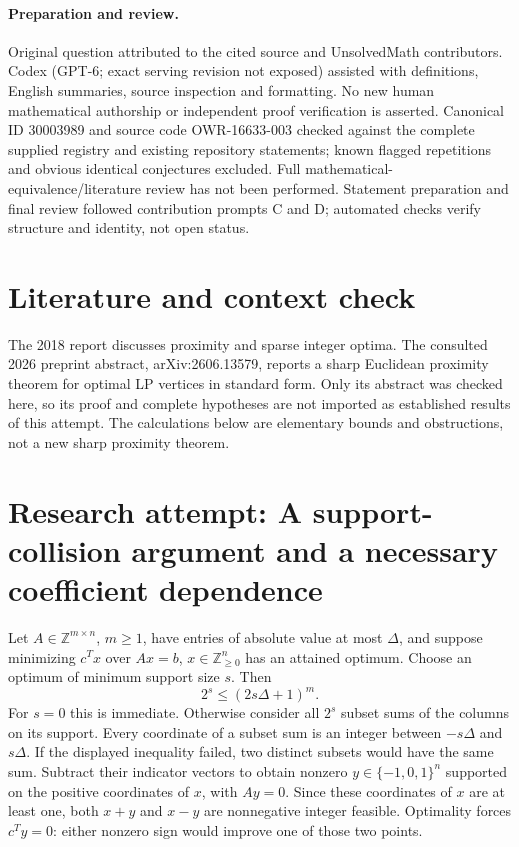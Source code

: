 \documentclass[11pt]{article}
\begin{document}
\paragraph{Preparation and review.}
Original question attributed to the cited source and UnsolvedMath contributors. Codex (GPT-6; exact serving revision not exposed) assisted with definitions, English summaries, source inspection and formatting. No new human mathematical authorship or independent proof verification is asserted. Canonical ID 30003989 and source code OWR-16633-003 checked against the complete supplied registry and existing repository statements; known flagged repetitions and obvious identical conjectures excluded. Full mathematical-equivalence/literature review has not been performed. Statement preparation and final review followed contribution prompts C and D; automated checks verify structure and identity, not open status.
\label{end:30003989}

\section{Literature and context check}
The 2018 report discusses proximity and sparse integer optima. The consulted 2026 preprint abstract, arXiv:2606.13579, reports a sharp Euclidean proximity theorem for optimal LP vertices in standard form. Only its abstract was checked here, so its proof and complete hypotheses are not imported as established results of this attempt. The calculations below are elementary bounds and obstructions, not a new sharp proximity theorem.
\section{Research attempt: A support-collision argument and a necessary coefficient dependence}
Let $A\in\mathbb Z^{m\times n}$, $m\ge1$, have entries of absolute value at most $\Delta$, and suppose minimizing $c^Tx$ over $Ax=b$, $x\in\mathbb Z_{\ge0}^n$ has an attained optimum. Choose an optimum of minimum support size $s$. Then
\[
2^s\le(2s\Delta+1)^m.
\]
For $s=0$ this is immediate. Otherwise consider all $2^s$ subset sums of the columns on its support. Every coordinate of a subset sum is an integer between $-s\Delta$ and $s\Delta$. If the displayed inequality failed, two distinct subsets would have the same sum. Subtract their indicator vectors to obtain nonzero $y\in\{-1,0,1\}^n$ supported on the positive coordinates of $x$, with $Ay=0$. Since these coordinates of $x$ are at least one, both $x+y$ and $x-y$ are nonnegative integer feasible. Optimality forces $c^Ty=0$: either nonzero sign would improve one of those two points.
\end{document}
